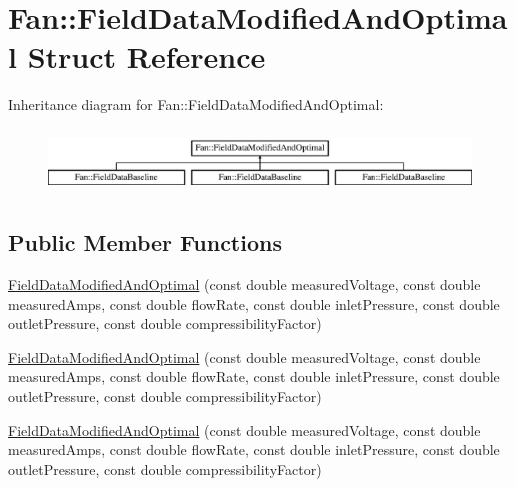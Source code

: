 \hypertarget{struct_fan_1_1_field_data_modified_and_optimal}{}\section{Fan\+:\+:Field\+Data\+Modified\+And\+Optimal Struct Reference}
\label{struct_fan_1_1_field_data_modified_and_optimal}
Inheritance diagram for Fan\+:\+:Field\+Data\+Modified\+And\+Optimal\+:\begin{figure}[H]
\begin{center}
\leavevmode
\includegraphics[height=1.728395cm]{d3/dba/struct_fan_1_1_field_data_modified_and_optimal}
\end{center}
\end{figure}
\subsection*{Public Member Functions}
\begin{DoxyCompactItemize}
\item 
\hyperlink{struct_fan_1_1_field_data_modified_and_optimal_a36b1ce30716ee49fab15b711225f1794}{Field\+Data\+Modified\+And\+Optimal} (const double measured\+Voltage, const double measured\+Amps, const double flow\+Rate, const double inlet\+Pressure, const double outlet\+Pressure, const double compressibility\+Factor)
\item 
\hyperlink{struct_fan_1_1_field_data_modified_and_optimal_a36b1ce30716ee49fab15b711225f1794}{Field\+Data\+Modified\+And\+Optimal} (const double measured\+Voltage, const double measured\+Amps, const double flow\+Rate, const double inlet\+Pressure, const double outlet\+Pressure, const double compressibility\+Factor)
\item 
\hyperlink{struct_fan_1_1_field_data_modified_and_optimal_a36b1ce30716ee49fab15b711225f1794}{Field\+Data\+Modified\+And\+Optimal} (const double measured\+Voltage, const double measured\+Amps, const double flow\+Rate, const double inlet\+Pressure, const double outlet\+Pressure, const double compressibility\+Factor)
\end{DoxyCompactItemize}
